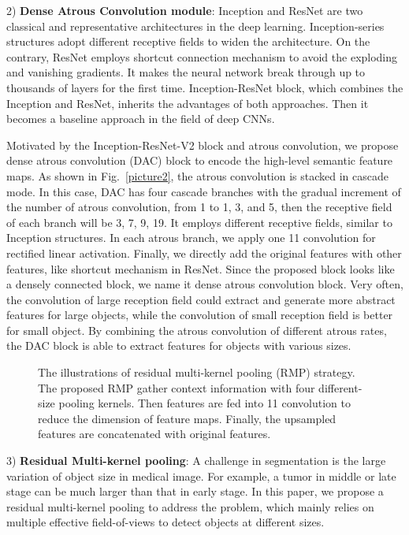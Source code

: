 \documentclass[journal]{IEEEtran}
\begin{document}
2) \textbf{Dense Atrous Convolution module}: Inception\cite{szegedy2017inception} and ResNet\cite{he2016deep} are two classical and representative architectures in the  deep learning. Inception-series structures adopt different receptive fields to widen the architecture.
On the contrary, ResNet employs shortcut connection mechanism to avoid the exploding and vanishing gradients. It makes the neural network break through up to thousands of layers for the first time.  Inception-ResNet \cite{szegedy2017inception} block, which combines the Inception and ResNet, inherits the advantages of both approaches. Then it becomes a baseline approach in the field of deep CNNs. 

Motivated by the Inception-ResNet-V2 block and atrous convolution, we propose  dense atrous convolution (DAC) block to encode the high-level semantic feature maps. As shown in Fig.~\ref{picture2}, the atrous convolution is stacked in cascade mode. In this case, DAC has four cascade branches with the gradual increment of the number of atrous convolution, from 1 to 1, 3, and 5, then the receptive field of each branch will be 3, 7, 9, 19.  It employs different receptive fields, similar to Inception structures. In each atrous branch, we apply one 11 convolution for rectified linear activation. Finally, we directly add the original features with other features, like shortcut mechanism in ResNet. Since the proposed block looks like a densely connected block, we name it dense atrous convolution block. Very often, the convolution of large reception field could extract and generate more abstract features for large objects, while the convolution of small reception field is better for small object. By combining   the atrous convolution of different atrous rates, the DAC block is able to extract features for  objects with various sizes.

\begin{figure}[!t]
	\centering
	\caption{The illustrations of residual multi-kernel pooling (RMP) strategy. The proposed RMP gather context information with four different-size pooling kernels. Then features are fed into 11 convolution to reduce the dimension of feature maps. Finally, the upsampled features are concatenated with original features.}
	\label{picture3}
\end{figure}

3) \textbf{Residual Multi-kernel pooling}: A challenge in segmentation is the large variation of object size in medical image. For example, a tumor in middle or late stage can be much larger than that in early stage. In this paper, we propose a residual multi-kernel pooling to address the problem, which mainly relies on multiple effective field-of-views to detect objects at different sizes.
\end{document}
